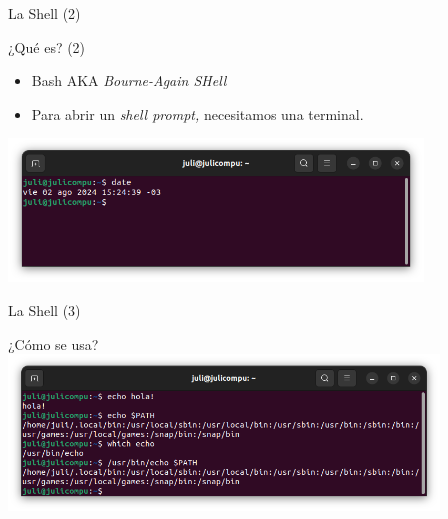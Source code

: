\begin{frame}{La Shell (2)}
    \begin{block}{¿Qué es? (2)}
        \begin{itemize}
                \item Bash AKA \textit{Bourne-Again SHell}
            \pause
            \item Para abrir un \textit{shell prompt,} necesitamos una terminal.
            \pause
        \end{itemize}
    \begin{centering}
    \includegraphics[height=1.5in]{images/bash-1.png}        
    \end{centering}
    \end{block}

\end{frame}

\begin{frame}{La Shell (3)}
    \begin{block}{¿Cómo se usa?}
        \centering
        \includegraphics[width=4.5in]{images/bash-2.png}
    \end{block}
    
\end{frame}

